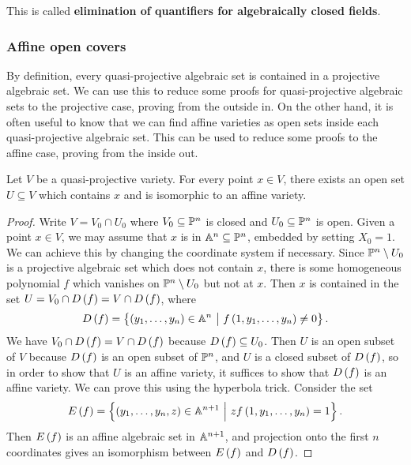 This is called \textbf{elimination of quantifiers for algebraically closed fields}.

\pagebreak

\subsubsection{Affine open covers}


By definition, every quasi-projective algebraic set is contained in a projective algebraic set. We can use this to reduce some proofs for quasi-projective algebraic sets to the projective case, proving from the outside in. On the other hand, it is often useful to know that we can find affine varieties as open sets inside each quasi-projective algebraic set. This can be used to reduce some proofs to the affine case, proving from the inside out.

\begin{lemma}
\label{lem:quasiprojectiveaffine}
Let $ V $ be a quasi-projective variety. For every point $ x \in V $, there exists an open set $ U \subseteq V $ which contains $ x $ and is isomorphic to an affine variety.
\end{lemma}

\begin{proof}
Write $ V = V_0 \cap U_0 $ where $ V_0 \subseteq \PP^n $ is closed and $ U_0 \subseteq \PP^n $ is open. Given a point $ x \in V $, we may assume that $ x $ is in $ \AA^n \subseteq \PP^n $, embedded by setting $ X_0 = 1 $. We can achieve this by changing the coordinate system if necessary. Since $ \PP^n \setminus U_0 $ is a projective algebraic set which does not contain $ x $, there is some homogeneous polynomial $ f $ which vanishes on $ \PP^n \setminus U_0 $ but not at $ x $. Then $ x $ is contained in the set $ U = V_0 \cap D\br{f} = V \cap D\br{f} $, where
$$ D\br{f} = \cbr{\br{y_1, \dots, y_n} \in \AA^n \st f\br{1, y_1, \dots, y_n} \ne 0}. $$
We have $ V_0 \cap D\br{f} = V \cap D\br{f} $ because $ D\br{f} \subseteq U_0 $. Then $ U $ is an open subset of $ V $ because $ D\br{f} $ is an open subset of $ \PP^n $, and $ U $ is a closed subset of $ D\br{f} $, so in order to show that $ U $ is an affine variety, it suffices to show that $ D\br{f} $ is an affine variety. We can prove this using the hyperbola trick. Consider the set
$$ E\br{f} = \cbr{\br{y_1, \dots, y_n, z} \in \AA^{n + 1} \st zf\br{1, y_1, \dots, y_n} = 1}. $$
Then $ E\br{f} $ is an affine algebraic set in $ \AA^{n + 1} $, and projection onto the first $ n $ coordinates gives an isomorphism between $ E\br{f} $ and $ D\br{f} $.
\end{proof}

